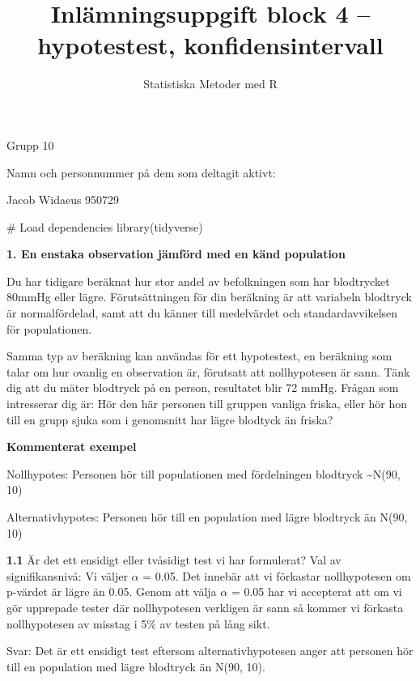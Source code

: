 \documentclass[
  letterpaper,
  DIV=11,
  numbers=noendperiod]{scrartcl}
\title{Inlämningsuppgift block 4 -- hypotestest, konfidensintervall}
\author{Statistiska Metoder med R}
\date{}
\newenvironment{Shaded}{\begin{snugshade}}{\end{snugshade}}
\newcommand{\CommentTok}[1]{\textcolor[rgb]{0.37,0.37,0.37}{#1}}
\newcommand{\FunctionTok}[1]{\textcolor[rgb]{0.28,0.35,0.67}{#1}}
\newcommand{\NormalTok}[1]{\textcolor[rgb]{0.00,0.23,0.31}{#1}}
\begin{document}
\maketitle

Grupp 10

Namn och personnummer på dem som deltagit aktivt:

Jacob Widaeus 950729

\hfill\break

\hfill\break

\begin{Shaded}
\begin{Highlighting}[]
\CommentTok{\# Load dependencies}
\FunctionTok{library}\NormalTok{(tidyverse)}
\end{Highlighting}
\end{Shaded}

\textbf{1. En enstaka observation jämförd med en känd population}

Du har tidigare beräknat hur stor andel av befolkningen som har
blodtrycket 80mmHg eller lägre. Förutsättningen för din beräkning är att
variabeln blodtryck är normalfördelad, samt att du känner till
medelvärdet och standardavvikelsen för populationen.

Samma typ av beräkning kan användas för ett hypotestest, en beräkning
som talar om hur ovanlig en observation är, förutsatt att nollhypotesen
är sann. Tänk dig att du mäter blodtryck på en person, resultatet blir
72 mmHg. Frågan som intresserar dig är: Hör den här personen till
gruppen vanliga friska, eller hör hon till en grupp sjuka som i
genomsnitt har lägre blodtyck än friska?

\textbf{Kommenterat exempel}

Nollhypotes: Personen hör till populationen med fördelningen blodtryck
\textasciitilde N(90, 10)

Alternativhypotes: Personen hör till en population med lägre blodtryck
än N(90, 10)

\textbf{1.1} Är det ett ensidigt eller tvåsidigt test vi har formulerat?
Val av signifikansnivå: Vi väljer \(α\) = 0.05. Det innebär att vi
förkastar nollhypotesen om p-värdet är lägre än 0.05. Genom att välja
\(α\) = 0.05 har vi accepterat att om vi gör upprepade tester där
nollhypotesen verkligen är sann så kommer vi förkasta nollhypotesen av
misstag i 5\% av testen på lång sikt.

\hfill\break
Svar: Det är ett ensidigt test eftersom alternativhypotesen anger att
personen hör till en population med lägre blodtryck än N(90, 10).\\
\end{document}
